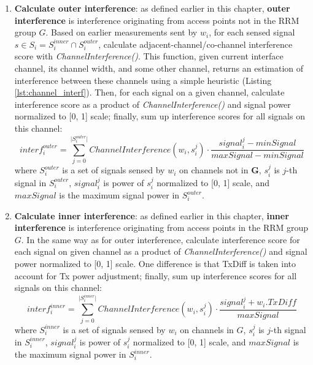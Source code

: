 \begin{enumerate}
    \item \textbf{Calculate outer interference}: as defined earlier in this chapter, \textbf{outer interference} is interference originating from access points not in the RRM group $G$.
    Based on earlier measurements sent by $w_i$, for each sensed signal $s \in S_i = S^{inner}_i \cap S^{outer}_i$, calculate adjacent-channel/co-channel interference score with \textit{ChannelInterference()}. This function, given current interface channel, its channel width, and some other channel, returns an estimation of interference between these channels using a simple heuristic (Listing \ref{lst:channel_interf}). Then, for each signal on a given channel, calculate interference score as a product of \textit{ChannelInterference()} and signal power normalized to [0, 1] scale; finally, sum up interference scores for all signals on this channel:
    \begin{equation}
        interf^{outer}_i = \sum_{j=0}^{\lvert S^{outer}_i \rvert} ChannelInterference(w_i, s^j_i) \cdot \frac{signal^j_i - minSignal}{maxSignal - minSignal}
    \end{equation}
    where $S^{outer}_i$ is a set of signals sensed by $w_i$ on channels not in $\mathbf{G}$, $s^j_i$ is $j$-th signal in $S^{outer}_i$, $signal^j_i$ is power of $s^j_i$ normalized to [0, 1] scale, and $maxSignal$ is the maximum signal power in $S^{outer}_i$.
    \item \textbf{Calculate inner interference}: as defined earlier in this chapter, \textbf{inner interference} is interference originating from access points in the RRM group $G$. In the same way as for outer interference, calculate interference score for each signal on given channel as a product of \textit{ChannelInterference()} and signal power normalized to [0, 1] scale. One difference is that TxDiff is taken into account for Tx power adjustment; finally, sum up interference scores for all signals on this channel:
    \begin{equation}
        interf^{inner}_i = \sum_{j=0}^{\lvert S^{inner}_i \rvert} ChannelInterference(w_i, s^j_i) \cdot \frac{signal^j_i + w_i.TxDiff}{maxSignal}
    \end{equation}
    where $S^{inner}_i$ is a set of signals sensed by $w_i$ on channels in $G$, $s^j_i$ is $j$-th signal in $S^{inner}_i$, $signal^j_i$ is power of $s^j_i$ normalized to [0, 1] scale, and $maxSignal$ is the maximum signal power in $S^{inner}_i$.
\end{enumerate}

